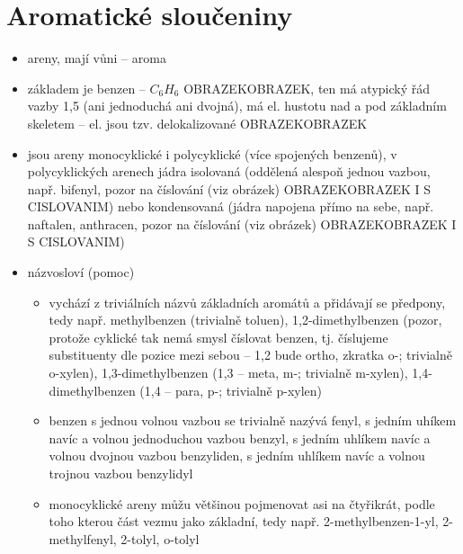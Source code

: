 \documentclass{article}
\begin{document}
\section{Aromatické sloučeniny}
\begin{itemize}
  \item areny, mají vůni -- aroma
  \item základem je benzen -- $C_6H_6$ OBRAZEKOBRAZEK, ten má atypický řád vazby 1,5 (ani jednoduchá ani dvojná), má el. hustotu nad a pod základním skeletem -- el. jsou tzv. delokalizované OBRAZEKOBRAZEK
  \item jsou areny monocyklické i polycyklické (více spojených benzenů), v polycyklických arenech jádra isolovaná (oddělená alespoň jednou vazbou, např. bifenyl, pozor na číslování (viz obrázek) OBRAZEKOBRAZEK I S CISLOVANIM) nebo kondensovaná (jádra napojena přímo na sebe, např. naftalen, anthracen, pozor na číslování (viz obrázek) OBRAZEKOBRAZEK I S CISLOVANIM)
  \item názvosloví (pomoc)
  \begin{itemize}
    \item vychází z triviálních názvů základních aromátů a přidávají se předpony, tedy např. methylbenzen (trivialně toluen), 1,2-dimethylbenzen (pozor, protože cyklické tak nemá smysl číslovat benzen, tj. číslujeme substituenty dle pozice mezi sebou -- 1,2 bude ortho, zkratka o-; trivialně o-xylen), 1,3-dimethylbenzen (1,3 -- meta, m-; trivialně m-xylen), 1,4-dimethylbenzen (1,4 -- para, p-; trivialně p-xylen)
    \item benzen s jednou volnou vazbou se trivialně nazývá fenyl, s jedním uhíkem navíc a volnou jednoduchou vazbou benzyl, s jedním uhlíkem navíc a volnou dvojnou vazbou benzyliden, s jedním uhlíkem navíc a volnou trojnou vazbou benzylidyl
    \item monocyklické areny můžu většinou pojmenovat asi na čtyřikrát, podle toho kterou část vezmu jako základní, tedy např. 2-methylbenzen-1-yl, 2-methylfenyl, 2-tolyl, o-tolyl
  \end{itemize}
\end{itemize}
\end{document}
